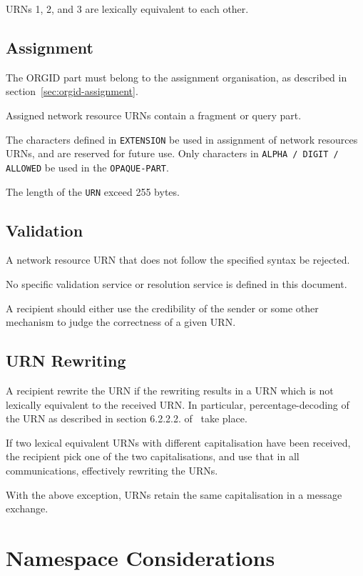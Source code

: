 \documentclass[12pt]{article}  %
\begin{document}
URNs 1, 2, and 3 are lexically equivalent to each other. 

\subsection{Assignment}

The ORGID part must belong to the assignment organisation, as described in 
section~\ref{sec:orgid-assignment}.

Assigned network resource URNs \MUSTNOT{} contain a fragment or query part.

The characters defined in \texttt{EXTENSION} \SHOULDNOT{} be used in assignment 
of network resources URNs, and are reserved for future use. 
Only characters in \texttt{ALPHA / DIGIT / ALLOWED} \SHOULD{} be used in the \texttt{OPAQUE-PART}.

The length of the \texttt{URN} \MUSTNOT{} exceed 255 bytes.

\subsection{Validation}

A network resource URN that does not follow the specified syntax \SHOULD{} be rejected.

No specific validation service or resolution service is defined in this document.

A recipient should either use the credibility of the sender or some other mechanism to 
judge the correctness of a given URN.

\subsection{URN Rewriting}

A recipient \MUSTNOT{} rewrite the URN if the rewriting results in a URN which is not 
lexically equivalent to the received URN.
In particular, percentage-decoding of the URN as described in section 6.2.2.2. 
of~\cite{rfc3986} \MUSTNOT{} take place.

If two lexical equivalent URNs with different capitalisation 
have been received, the recipient \MAY{} pick one of the two 
capitalisations, and use that in all communications, effectively rewriting 
the URNs.

With the above exception, URNs \SHOULD{} retain the same capitalisation in a message exchange.

\section{Namespace Considerations}
\end{document}
